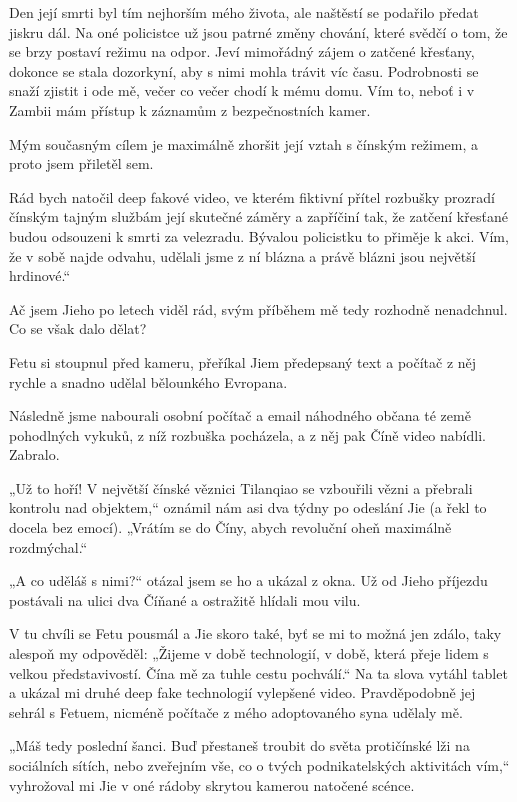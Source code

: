 {Den její smrti byl tím nejhorším mého života, ale naštěstí se podařilo předat jiskru dál. Na oné policistce už jsou patrné změny chování, které svědčí o tom, že se brzy postaví režimu na odpor. Jeví mimořádný zájem o zatčené křesťany, dokonce se stala dozorkyní, aby s nimi mohla trávit víc času. Podrobnosti se snaží zjistit i ode mě, večer co večer chodí k mému domu. Vím to, neboť i v Zambii mám přístup k záznamům z bezpečnostních kamer.

Mým současným cílem je maximálně zhoršit její vztah s čínským režimem, a proto jsem přiletěl sem. 

Rád bych natočil deep fakové video, ve kterém fiktivní přítel rozbušky prozradí čínským tajným službám její skutečné záměry a zapříčiní tak, že zatčení křesťané budou odsouzeni k smrti za velezradu. Bývalou policistku to přiměje k akci. Vím, že v sobě najde odvahu, udělali jsme z ní blázna a právě blázni jsou největší hrdinové.“

Ač jsem Jieho po letech viděl rád, svým příběhem mě tedy rozhodně nenadchnul. Co se však dalo dělat? 

Fetu si stoupnul před kameru, přeříkal Jiem předepsaný text a počítač z něj rychle a snadno udělal bělounkého Evropana.

Následně jsme nabourali osobní počítač a email náhodného občana té země pohodlných vykuků, z níž rozbuška pocházela, a z něj pak Číně video nabídli. Zabralo.

„Už to hoří! V největší čínské věznici Tilanqiao se vzbouřili vězni a přebrali kontrolu nad objektem,“ oznámil nám asi dva týdny po odeslání Jie (a řekl to docela bez emocí). „Vrátím se do Číny, abych revoluční oheň maximálně rozdmýchal.“

„A co uděláš s nimi?“ otázal jsem se ho a ukázal z okna. Už od Jieho příjezdu postávali na ulici dva Číňané a ostražitě hlídali mou vilu.

V tu chvíli se Fetu pousmál a Jie skoro také, byť se mi to možná jen zdálo, taky alespoň my odpověděl: „Žijeme v době technologií, v době, která přeje lidem s velkou představivostí. Čína mě za tuhle cestu pochválí.“ Na ta slova vytáhl tablet a ukázal mi druhé deep fake technologií vylepšené video. Pravděpodobně jej sehrál s Fetuem, nicméně počítače z mého adoptovaného syna udělaly mě.

„Máš tedy poslední šanci. Buď přestaneš troubit do světa protičínské lži na sociálních sítích, nebo zveřejním vše, co o tvých podnikatelských aktivitách vím,“ vyhrožoval mi Jie v oné rádoby skrytou kamerou natočené scénce.

}
